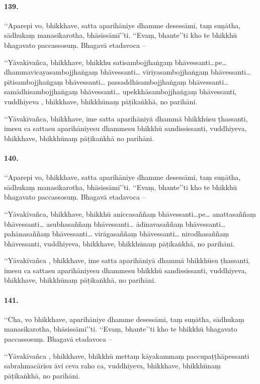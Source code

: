 \paragraph{139.} ‘‘Aparepi vo, bhikkhave, satta aparihāniye dhamme desessāmi, taṃ suṇātha, sādhukaṃ manasikarotha, bhāsissāmī’’ti. ‘‘Evaṃ, bhante’’ti kho te bhikkhū bhagavato paccassosuṃ. Bhagavā etadavoca –

‘‘Yāvakīvañca, bhikkhave, bhikkhu satisambojjhaṅgaṃ bhāvessanti…pe… dhammavicayasambojjhaṅgaṃ bhāvessanti… vīriyasambojjhaṅgaṃ bhāvessanti… pītisambojjhaṅgaṃ bhāvessanti… passaddhisambojjhaṅgaṃ bhāvessanti… samādhisambojjhaṅgaṃ bhāvessanti… upekkhāsambojjhaṅgaṃ bhāvessanti, vuddhiyeva , bhikkhave, bhikkhūnaṃ pāṭikaṅkhā, no parihāni.

‘‘Yāvakīvañca, bhikkhave, ime satta aparihāniyā dhammā bhikkhūsu ṭhassanti, imesu ca sattasu aparihāniyesu dhammesu bhikkhū sandississanti, vuddhiyeva, bhikkhave, bhikkhūnaṃ pāṭikaṅkhā no parihāni.

\paragraph{140.} ‘‘Aparepi vo, bhikkhave, satta aparihāniye dhamme desessāmi, taṃ suṇātha, sādhukaṃ manasikarotha, bhāsissāmī’’ti. ‘‘Evaṃ, bhante’’ti kho te bhikkhū bhagavato paccassosuṃ. Bhagavā etadavoca –

‘‘Yāvakīvañca, bhikkhave, bhikkhū aniccasaññaṃ bhāvessanti…pe… anattasaññaṃ bhāvessanti… asubhasaññaṃ bhāvessanti… ādīnavasaññaṃ bhāvessanti… pahānasaññaṃ bhāvessanti… virāgasaññaṃ bhāvessanti… nirodhasaññaṃ bhāvessanti, vuddhiyeva, bhikkhave, bhikkhūnaṃ pāṭikaṅkhā, no parihāni.

‘‘Yāvakīvañca , bhikkhave, ime satta aparihāniyā dhammā bhikkhūsu ṭhassanti, imesu ca sattasu aparihāniyesu dhammesu bhikkhū sandississanti, vuddhiyeva, bhikkhave, bhikkhūnaṃ pāṭikaṅkhā, no parihāni.

\paragraph{141.} ‘‘Cha, vo bhikkhave, aparihāniye dhamme desessāmi, taṃ suṇātha, sādhukaṃ manasikarotha, bhāsissāmī’’ti. ‘‘Evaṃ, bhante’’ti kho te bhikkhū bhagavato paccassosuṃ. Bhagavā etadavoca –

‘‘Yāvakīvañca , bhikkhave, bhikkhū mettaṃ kāyakammaṃ paccupaṭṭhāpessanti sabrahmacārīsu āvi ceva raho ca, vuddhiyeva, bhikkhave, bhikkhūnaṃ pāṭikaṅkhā, no parihāni.

